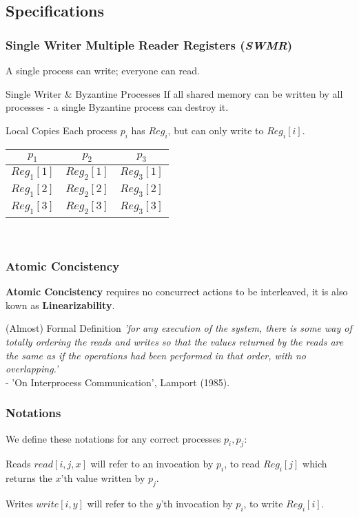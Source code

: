 \subsection{Specifications}
\begin{frame}
    \frametitle{Single Writer Multiple Reader Registers (\emph{SWMR})}
    A single process can write; everyone can read.\\
    \begin{block}{Single Writer \& Byzantine Processes}
        If all shared memory can be written by all processes - a single Byzantine process can destroy it.
    \end{block}
    \begin{block}{Local Copies}
    Each process $p_i$ has $Reg_i$, but can only write to \alert{$Reg_i[i]$}.
        \begin{center}
            \begin{tabular}{|c|c|c|}
                \hline
                $p_1$ & $p_2$ & $p_3$ \\
                \hline
                \alert{$Reg_1[1]$} & $Reg_2[1]$ & $Reg_3[1]$ \\  
                $Reg_1[2]$ & \alert{$Reg_2[2]$} & $Reg_3[2]$ \\  
                $Reg_1[3]$ & $Reg_2[3]$ & \alert{$Reg_3[3]$} \\
                \hline
            \end{tabular}\\
        \end{center}
    \end{block}
\end{frame}
\begin{frame}
    \frametitle{Atomic Concistency}
    \textbf{Atomic Concistency} requires no concurrect actions to be interleaved,
    it is also kown as \textbf{Linearizability}.
    \begin{block}{(Almost) Formal Definition}
        \emph{'for any execution of the system, there is some way of totally ordering
        the reads and writes so that the values returned by the reads are the same
        as if the operations had been performed in that order, with no overlapping.'}\\
        - 'On Interprocess Communication', Lamport (1985).
    \end{block}
\end{frame}
\begin{frame}
    \frametitle{Notations}
    We define these notations for any correct processes $p_i, p_j$:
    \begin{block}{Reads}
        $read[i,j,x]$ will refer to an invocation by $p_i$, to read $Reg_i[j]$
        which returns the $x$'th value written by $p_j$.
    \end{block}
    \begin{block}{Writes}
        $write[i,y]$ will refer to the $y$'th invocation by $p_i$, to write $Reg_i[i]$.
    \end{block}

\end{frame}
